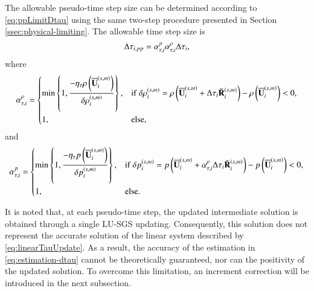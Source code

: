 The allowable pseudo-time step size can be determined according to \eqref{eq:ppLimitDtau}
using the same two-step procedure presented in Section \ref{ssec:physical-limiting}.
The allowable time step size is 
\begin{equation}
    \label{eq:alpha-tau}
    \mathrm\Delta \tau_{i,pp}= \alpha_{\tau,i}^{p}\alpha_{\tau,i}^{\rho} \mathrm\Delta  \tau_{i},
\end{equation}
where
\begin{equation}
    \label{eq:alpha-tau-rho}
    \alpha_{\tau,i}^{\rho} = \begin{dcases}
        \min\left\{1, \dfrac{-\eta_\tau \rho\left(\overline{\mathbf{U}}^{\left(s,m\right)}_i\right)}{\delta \rho_i^{\left(s,m\right)}} \right\}, & \mathrm{if} \ \delta \rho_i^{\left(s,m\right)}= \rho\left(\overline{\mathbf{U}}^{\left(s,m\right)}_i + \mathrm\Delta \tau_{i} \tilde{\mathbf{R}}^{\left(s,m\right)}_i\right) - \rho\left(\overline{\mathbf{U}}^{\left(s,m\right)}_i\right) < 0, \\
        1, & \mathrm{else},
    \end{dcases}
\end{equation}
and
\begin{equation}
    \label{eq:alpha-tau-p}
    \alpha_{\tau,i}^{p} = \begin{dcases}
        \min\left\{1, \dfrac{-\eta_\tau p \left(\overline{\mathbf{U}}^{\left(s,m\right)}_i\right)}{\delta p_i^{\left(s,m\right)}} \right\}, & \mathrm{if} \ \delta p_i^{\left(s,m\right)} = p \left(\overline{\mathbf{U}}^{\left(s,m\right)}_i + \alpha_{\tau,i}^{\rho} \mathrm\Delta \tau_{i} \tilde{\mathbf{R}}^{\left(s,m\right)}_i\right) -p \left(\overline{\mathbf{U}}^{\left(s,m\right)}_i\right) < 0, \\
        1, &\mathrm{else}.
    \end{dcases}
\end{equation}

It is noted that, at each pseudo-time step, the updated intermediate solution is obtained through a single LU-SGS updating. Consequently, this solution does not represent the accurate solution of the linear system described by \eqref{eq:linearTauUpdate}. As a result, the accuracy of the estimation in \eqref{eq:estimation-dtau} cannot be theoretically guaranteed, nor can the positivity of the updated solution. %
To overcome this limitation, an increment correction will be introduced in the next subsection.

